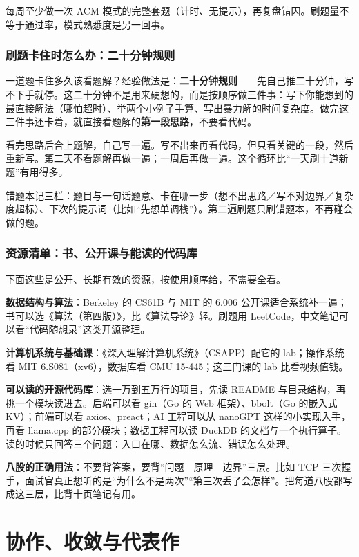 \documentclass[UTF8,zihao=5,openany]{ctexbook}
\begin{document}
每周至少做一次 ACM 模式的完整套题（计时、无提示），再复盘错因。刷题量不等于通过率，模式熟悉度是另一回事。

\clearpage\subsection{刷题卡住时怎么办：二十分钟规则}

一道题卡住多久该看题解？经验做法是：\textbf{二十分钟规则}——先自己推二十分钟，写不下手就停。这二十分钟不是用来硬想的，而是按顺序做三件事：写下你能想到的最直接解法（哪怕超时）、举两个小例子手算、写出暴力解的时间复杂度。做完这三件事还卡着，就直接看题解的\textbf{第一段思路}，不要看代码。

看完思路后合上题解，自己写一遍。写不出来再看代码，但只看关键的一段，然后重新写。第二天不看题解再做一遍；一周后再做一遍。这个循环比“一天刷十道新题”有用得多。

错题本记三栏：题目与一句话题意、卡在哪一步（想不出思路／写不对边界／复杂度超标）、下次的提示词（比如“先想单调栈”）。第二遍刷题只刷错题本，不再碰会做的题。

\subsection{资源清单：书、公开课与能读的代码库}

下面这些是公开、长期有效的资源，按使用顺序给，不需要全看。

\textbf{数据结构与算法}：Berkeley 的 CS61B 与 MIT 的 6.006 公开课适合系统补一遍；书可以选《算法（第四版）》，比《算法导论》轻。刷题用 LeetCode，中文笔记可以看“代码随想录”这类开源整理。

\textbf{计算机系统与基础课}：《深入理解计算机系统》（CSAPP）配它的 lab；操作系统看 MIT 6.S081（xv6），数据库看 CMU 15-445；这三门课的 lab 比看视频值钱。

\textbf{可以读的开源代码库}：选一万到五万行的项目，先读 README 与目录结构，再挑一个模块读进去。后端可以看 gin（Go 的 Web 框架）、bbolt（Go 的嵌入式 KV）；前端可以看 axios、preact；AI 工程可以从 nanoGPT 这样的小实现入手，再看 llama.cpp 的部分模块；数据工程可以读 DuckDB 的文档与一个执行算子。读的时候只回答三个问题：入口在哪、数据怎么流、错误怎么处理。

\textbf{八股的正确用法}：不要背答案，要背“问题—原理—边界”三层。比如 TCP 三次握手，面试官真正想听的是“为什么不是两次”“第三次丢了会怎样”。把每道八股都写成这三层，比背十页笔记有用。


\chapter{协作、收敛与代表作}
\end{document}

